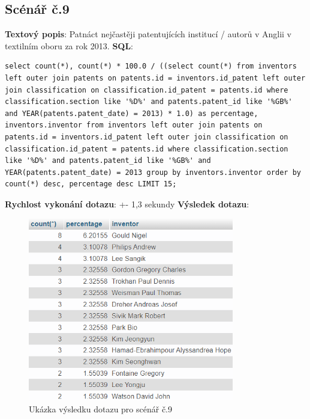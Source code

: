 \subsection{Scénář č.9}
\textbf{Textový popis}: Patnáct nejčastěji patentujících institucí / autorů v Anglii v textilním oboru za rok 2013.
\newline
\textbf{SQL}: 
\begin{lstlisting}[label = {lst:elements_a}]
select count(*), count(*) * 100.0 / ((select count(*) from inventors left outer join patents on patents.id = inventors.id_patent left outer join classification on classification.id_patent = patents.id where classification.section like '%D%' and patents.patent_id like '%GB%' and YEAR(patents.patent_date) = 2013) * 1.0) as percentage, inventors.inventor from inventors left outer join patents on patents.id = inventors.id_patent left outer join classification on classification.id_patent = patents.id where classification.section like '%D%' and patents.patent_id like '%GB%' and YEAR(patents.patent_date) = 2013 group by inventors.inventor order by count(*) desc, percentage desc LIMIT 15;
\end{lstlisting}
\textbf{Rychlost vykonání dotazu}: +- 1,3 sekundy
\newline
\textbf{Výsledek dotazu}:
\begin{figure}[H]
\centering
\includegraphics[width=9cm]{img/scenare/scenar_9}
\caption{Ukázka výsledku dotazu pro scénář č.9}
\label{fig:scenar9}
\end{figure}